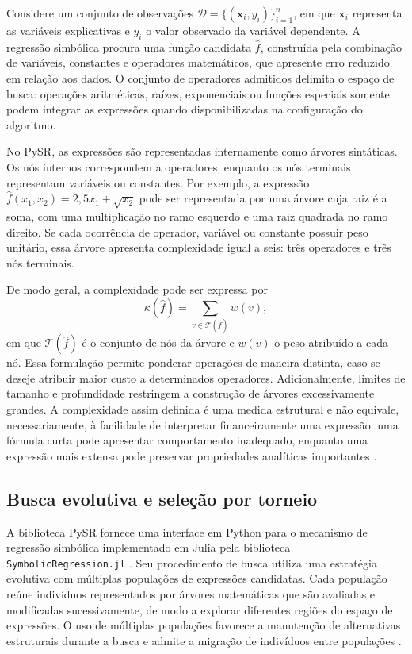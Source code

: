 Considere um conjunto de observações $\mathcal{D}=\{(\boldsymbol{x}_i,y_i)\}_{i=1}^{n}$, em que $\boldsymbol{x}_i$ representa as variáveis explicativas e $y_i$ o valor observado da variável dependente. A regressão simbólica procura uma função candidata $\widehat{f}$, construída pela combinação de variáveis, constantes e operadores matemáticos, que apresente erro reduzido em relação aos dados. O conjunto de operadores admitidos delimita o espaço de busca: operações aritméticas, raízes, exponenciais ou funções especiais somente podem integrar as expressões quando disponibilizadas na configuração do algoritmo.

No PySR, as expressões são representadas internamente como árvores sintáticas. Os nós internos correspondem a operadores, enquanto os nós terminais representam variáveis ou constantes. Por exemplo, a expressão $\widehat f(x_1,x_2)=2{,}5x_1+\sqrt{x_2}$ pode ser representada por uma árvore cuja raiz é a soma, com uma multiplicação no ramo esquerdo e uma raiz quadrada no ramo direito. Se cada ocorrência de operador, variável ou constante possuir peso unitário, essa árvore apresenta complexidade igual a seis: três operadores e três nós terminais.

De modo geral, a complexidade pode ser expressa por
\begin{equation}
\label{eq:sr_complexidade}
\kappa(\widehat f)=\sum_{v\in\mathcal{T}(\widehat f)}w(v),
\end{equation}
em que $\mathcal{T}(\widehat f)$ é o conjunto de nós da árvore e $w(v)$ o peso atribuído a cada nó. Essa formulação permite ponderar operações de maneira distinta, caso se deseje atribuir maior custo a determinados operadores. Adicionalmente, limites de tamanho e profundidade restringem a construção de árvores excessivamente grandes. A complexidade assim definida é uma medida estrutural e não equivale, necessariamente, à facilidade de interpretar financeiramente uma expressão: uma fórmula curta pode apresentar comportamento inadequado, enquanto uma expressão mais extensa pode preservar propriedades analíticas importantes \cite{cranmer2023pysr}.

\subsection{Busca evolutiva e seleção por torneio}
\label{subsec:sr_busca_evolutiva}

A biblioteca PySR fornece uma interface em Python para o mecanismo de regressão simbólica implementado em Julia pela biblioteca \texttt{SymbolicRegression.jl} \cite{pysr_repositorio}. Seu procedimento de busca utiliza uma estratégia evolutiva com múltiplas populações de expressões candidatas. Cada população reúne indivíduos representados por árvores matemáticas que são avaliadas e modificadas sucessivamente, de modo a explorar diferentes regiões do espaço de expressões. O uso de múltiplas populações favorece a manutenção de alternativas estruturais durante a busca e admite a migração de indivíduos entre populações \cite{cranmer2023pysr}.

